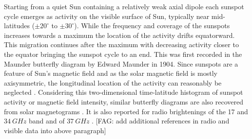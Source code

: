\documentclass{aa}
\newcommand{\fag}[1]{\textcolor{midpurple}{[FAG: #1]}} %
\begin{document}
  Starting from a quiet Sun containing a relatively weak axial dipole 
  each sunspot cycle emerges as
  activity on the visible surface of Sun, typically near mid-latitudes
  ($\pm20^{\circ}$ to $\pm 30^{\circ}$).
  While the frequency and coverage of the sunspots increases towards a maximum
  the location of the activity drifts equatorward. 
  This migration continues after the maximum with decreasing activity
  closer to the equator bringing the sunspot cycle to an end.
  This was first recorded in the Maunder butterfly diagram by Edward Maunder
  in 1904.
  Since sunspots are a feature of Sun's magnetic field and as the solar
  magnetic field is mostly axisymmetric, 
  the longitudinal location of the
  activity can reasonably be neglected \citep{PBKT06}.
  Considering this two-dimensional time-latitude histogram of sunspot activity
  or magnetic field intensity, similar butterfly 
  diagrams are also recovered from solar magnetograms
  \citep{GHHZ83,VLMCS12,LUSDADM17}.
  It is also reported for radio brightenings of the 17 and $\SI{34}{GHz}$ band
  \citep{Shibasaki13,SCGVPS14} and of $\SI{37}{GHz}$ \citep{metsahovi40}.
  \fag{add additional references in radio and visible data into above paragraph}
 
\end{document}
